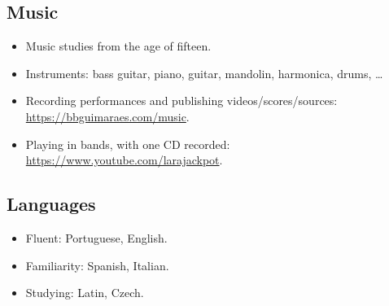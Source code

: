 \subsection*{Music}

\begin{itemize}[noitemsep]
    \item Music studies from the age of fifteen.
    \item
        Instruments: bass guitar, piano, guitar, mandolin, harmonica, drums, …
    \item
        Recording performances and publishing videos/scores/sources:
        \url{https://bbguimaraes.com/music}.
    \item
        Playing in bands, with one CD recorded:
        \url{https://www.youtube.com/larajackpot}.
\end{itemize}

\subsection*{Languages}

\begin{itemize}[noitemsep]
    \item Fluent: Portuguese, English.
    \item Familiarity: Spanish, Italian.
    \item Studying: Latin, Czech.
\end{itemize}
